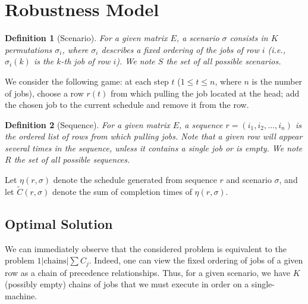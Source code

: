 \documentclass{article}
\newtheorem{definition}{Definition}
\begin{document}
\newpage

\section{Robustness Model}

\begin{definition}[Scenario]
    For a given matrix \(E\), a scenario \(\sigma\) consists in \(K\) permutations \(\sigma_i\), where \(\sigma_i\) describes a fixed ordering of the jobs of row \(i\) (i.e., \(\sigma_i(k)\) is the \(k\)-th job of row \(i\)).
    We note \(S\) the set of all possible scenarios.
\end{definition}

We consider the following game: at each step \(t\) (\(1\le t\le n\), where \(n\) is the number of jobs), choose a row \(r(t)\) from which pulling the job located at the head; add the chosen job to the current schedule and remove it from the row.

\begin{definition}[Sequence]
    For a given matrix \(E\), a sequence \(r=(i_1,i_2,\ldots,i_n)\) is the ordered list of rows from which pulling jobs.
    Note that a given row will appear several times in the sequence, unless it contains a single job or is empty.
    We note \(R\) the set of all possible sequences.
\end{definition}


Let \(\eta(r,\sigma)\) denote the schedule generated from sequence \(r\) and scenario \(\sigma\), and let \(\tilde{C}(r,\sigma)\) denote the sum of completion times of \(\eta(r,\sigma)\).

\subsection{Optimal Solution}

We can immediately observe that the considered problem is equivalent to the problem \(1|\text{chains}|\sum C_j\).
Indeed, one can view the fixed ordering of jobs of a given row as a chain of precedence relationships.
Thus, for a given scenario, we have \(K\) (possibly empty) chains of jobs that we must execute in order on a single-machine.
\end{document}
